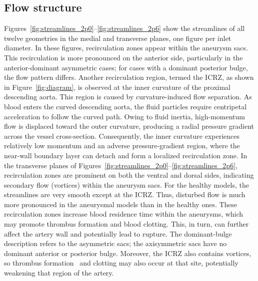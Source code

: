 \documentclass[12pt,a4paper]{article}
\newcommand{\cfdrevision}[1]{#1} %
\newcommand{\ICRZ}{\ac{ICRZ}\xspace}
\theoremstyle{definition}
\numberwithin{equation}{section}
\providecommand{\DIFaddtex}[1]{{\protect\color{blue} \sf #1}} %
\providecommand{\DIFdeltex}[1]{{\protect\color{red} \scriptsize #1}} %
\providecommand{\DIFaddbegin}{} %
\providecommand{\DIFaddend}{} %
\providecommand{\DIFdelbegin}{} %
\providecommand{\DIFdelend}{} %
\providecommand{\DIFadd}[1]{\texorpdfstring{\DIFaddtex{#1}}{#1}} %
\providecommand{\DIFdel}[1]{\texorpdfstring{\DIFdeltex{#1}}{}} %
\newcommand{\DIFscaledelfig}{0.5}
\newlength{\DIFdelgraphicswidth} %
\newlength{\DIFdelgraphicsheight} %
\newcommand{\DIFaddincludegraphics}[2][]{{\color{blue}\fbox{\DIFOincludegraphics[#1]{#2}}}} %
\newcommand{\DIFdelincludegraphics}[2][]{%
\sbox{\DIFdelgraphicsbox}{\DIFOincludegraphics[#1]{#2}}%
\settoboxwidth{\DIFdelgraphicswidth}{\DIFdelgraphicsbox} %
\settoboxtotalheight{\DIFdelgraphicsheight}{\DIFdelgraphicsbox} %
\scalebox{\DIFscaledelfig}{%
\parbox[b]{\DIFdelgraphicswidth}{\usebox{\DIFdelgraphicsbox}\\[-\baselineskip] \rule{\DIFdelgraphicswidth}{0em}}\llap{\resizebox{\DIFdelgraphicswidth}{\DIFdelgraphicsheight}{%
\setlength{\unitlength}{\DIFdelgraphicswidth}%
\begin{picture}(1,1)%
\thicklines\linethickness{2pt} %
{\color[rgb]{1,0,0}\put(0,0){\framebox(1,1){}}}%
{\color[rgb]{1,0,0}\put(0,0){\line( 1,1){1}}}%
{\color[rgb]{1,0,0}\put(0,1){\line(1,-1){1}}}%
\end{picture}%
}\hspace*{3pt}}} %
} %
\DeclareRobustCommand{\DIFaddbegin}{\DIFOaddbegin \let\includegraphics\DIFaddincludegraphics} %
\DeclareRobustCommand{\DIFaddend}{\DIFOaddend \let\includegraphics\DIFOincludegraphics} %
\DeclareRobustCommand{\DIFdelbegin}{\DIFOdelbegin \let\includegraphics\DIFdelincludegraphics} %
\DeclareRobustCommand{\DIFdelend}{\DIFOaddend \let\includegraphics\DIFOincludegraphics} %
\renewcommand{\DIFaddtex}[1]{{\protect\color{red}#1}}
\renewcommand{\DIFdeltex}[1]{}
\renewcommand{\DIFdel}[1]{}
\renewcommand{\DIFaddincludegraphics}[2][]{\DIFOincludegraphics[#1]{#2}}
\renewcommand{\DIFdelincludegraphics}[2][]{}
\renewcommand{\cfdrevision}[1]{\textcolor{red}{#1}}
\def\DIFaddbegin{}\def\DIFaddend{}%
\def\DIFdelbegin{}\def\DIFdelend{}%
\def\cfdrevision#1{#1}%
\begin{document}
\subsection{Flow structure}
Figures~\ref{fig:streamlines_2p0}--\ref{fig:streamlines_2p6} show the streamlines of all twelve geometries in the medial and transverse planes, one figure per inlet diameter. In these figures, recirculation zones appear within the aneurysm sacs. This recirculation is more pronounced on the anterior side, \DIFdelbegin \DIFdel{especially for saccular cases and for fusiform cases where the anterior bulge dominates; for cases }\DIFdelend \DIFaddbegin \DIFadd{\cfdrevision{particularly in the anterior-dominant asymmetric cases;} for cases }\DIFaddend with a dominant posterior bulge, the flow pattern differs. Another recirculation region, termed the \ICRZ, as shown in Figure~\ref{fig:diagram}, is observed at the inner curvature of the proximal descending aorta. This region is caused by curvature-induced flow separation. As blood enters the curved descending aorta, the fluid particles require centripetal acceleration to follow the curved path. Owing to fluid inertia, high-momentum flow is displaced toward the outer curvature, producing a radial pressure gradient across the vessel cross-section. Consequently, the inner curvature experiences relatively low momentum and an adverse pressure-gradient region, where the near-wall boundary layer can detach and form a localized recirculation zone. In the transverse planes of Figures~\ref{fig:streamlines_2p0}--\ref{fig:streamlines_2p6}, recirculation zones are prominent on both the ventral and dorsal sides, indicating secondary flow (vortices) within the aneurysm sacs. For the healthy models, the streamlines are very smooth except at the \ICRZ. Thus, disturbed flow is much more pronounced in the aneurysmal models than in the healthy ones. These recirculation zones increase blood residence time within the aneurysms, which may promote thrombus formation and blood clotting. This, in turn, can further affect the artery wall and potentially lead to rupture. \DIFdelbegin \DIFdel{The recirculation zones are most pronounced in fusiform cases where the bulge is prominently asymmetric, especially when the anterior bulge dominates. }\DIFdelend \DIFaddbegin \DIFadd{\cfdrevision{The dominant-bulge description refers to the asymmetric sacs; the axisymmetric sacs have no dominant anterior or posterior bulge.} }\DIFaddend Moreover, the \ICRZ also contains vortices, so thrombus formation~\cite{salman2019biomechanical} and clotting may also occur at that site, potentially weakening that region of the artery.
\end{document}
